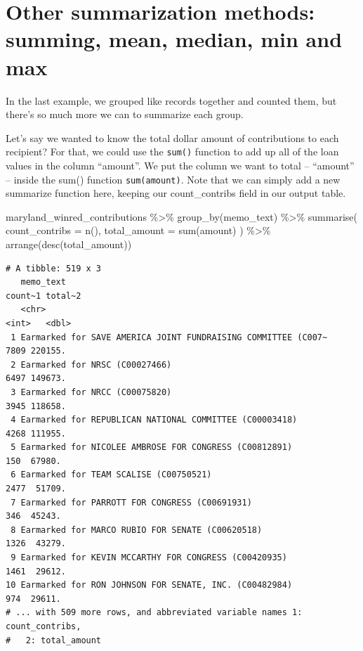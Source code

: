 \documentclass[
  letterpaper,
  DIV=11,
  numbers=noendperiod]{scrreprt}
\newenvironment{Shaded}{\begin{snugshade}}{\end{snugshade}}
\newcommand{\AttributeTok}[1]{\textcolor[rgb]{0.40,0.45,0.13}{#1}}
\newcommand{\FunctionTok}[1]{\textcolor[rgb]{0.28,0.35,0.67}{#1}}
\newcommand{\NormalTok}[1]{\textcolor[rgb]{0.00,0.23,0.31}{#1}}
\newcommand{\SpecialCharTok}[1]{\textcolor[rgb]{0.37,0.37,0.37}{#1}}
\begin{document}
\hypertarget{other-summarization-methods-summing-mean-median-min-and-max}{%
\section{Other summarization methods: summing, mean, median, min and
max}\label{other-summarization-methods-summing-mean-median-min-and-max}}

In the last example, we grouped like records together and counted them,
but there's so much more we can to summarize each group.

Let's say we wanted to know the total dollar amount of contributions to
each recipient? For that, we could use the \texttt{sum()} function to
add up all of the loan values in the column ``amount''. We put the
column we want to total -- ``amount'' -- inside the sum() function
\texttt{sum(amount)}. Note that we can simply add a new summarize
function here, keeping our count\_contribs field in our output table.

\begin{Shaded}
\begin{Highlighting}[]
\NormalTok{maryland\_winred\_contributions }\SpecialCharTok{\%\textgreater{}\%}
  \FunctionTok{group\_by}\NormalTok{(memo\_text) }\SpecialCharTok{\%\textgreater{}\%}
  \FunctionTok{summarise}\NormalTok{(}
    \AttributeTok{count\_contribs =} \FunctionTok{n}\NormalTok{(),}
    \AttributeTok{total\_amount =} \FunctionTok{sum}\NormalTok{(amount)}
\NormalTok{  ) }\SpecialCharTok{\%\textgreater{}\%}
  \FunctionTok{arrange}\NormalTok{(}\FunctionTok{desc}\NormalTok{(total\_amount))}
\end{Highlighting}
\end{Shaded}

\begin{verbatim}
# A tibble: 519 x 3
   memo_text                                                     count~1 total~2
   <chr>                                                           <int>   <dbl>
 1 Earmarked for SAVE AMERICA JOINT FUNDRAISING COMMITTEE (C007~    7809 220155.
 2 Earmarked for NRSC (C00027466)                                   6497 149673.
 3 Earmarked for NRCC (C00075820)                                   3945 118658.
 4 Earmarked for REPUBLICAN NATIONAL COMMITTEE (C00003418)          4268 111955.
 5 Earmarked for NICOLEE AMBROSE FOR CONGRESS (C00812891)            150  67980.
 6 Earmarked for TEAM SCALISE (C00750521)                           2477  51709.
 7 Earmarked for PARROTT FOR CONGRESS (C00691931)                    346  45243.
 8 Earmarked for MARCO RUBIO FOR SENATE (C00620518)                 1326  43279.
 9 Earmarked for KEVIN MCCARTHY FOR CONGRESS (C00420935)            1461  29612.
10 Earmarked for RON JOHNSON FOR SENATE, INC. (C00482984)            974  29611.
# ... with 509 more rows, and abbreviated variable names 1: count_contribs,
#   2: total_amount
\end{verbatim}
\end{document}
